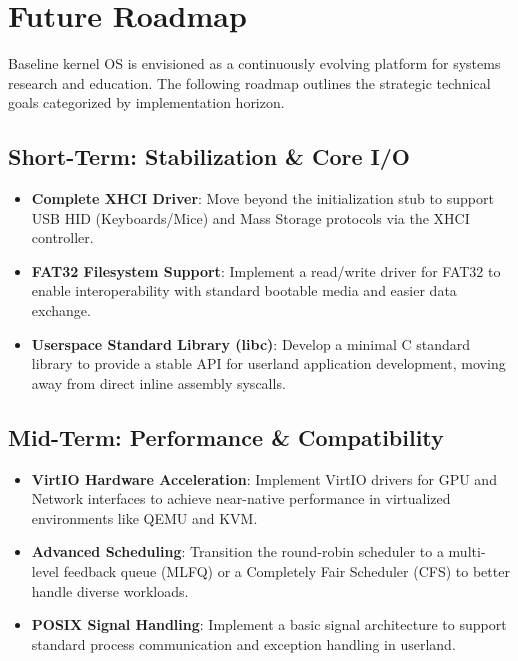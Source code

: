 \documentclass[12pt,a4paper]{report}
\begin{document}
\newpage

\chapter{Future Roadmap}
Baseline kernel OS is envisioned as a continuously evolving platform for systems research and education. The following roadmap outlines the strategic technical goals categorized by implementation horizon.

\section{Short-Term: Stabilization \& Core I/O}
\begin{itemize}
    \item \textbf{Complete XHCI Driver}: Move beyond the initialization stub to support USB HID (Keyboards/Mice) and Mass Storage protocols via the XHCI controller.
    \item \textbf{FAT32 Filesystem Support}: Implement a read/write driver for FAT32 to enable interoperability with standard bootable media and easier data exchange.
    \item \textbf{Userspace Standard Library (libc)}: Develop a minimal C standard library to provide a stable API for userland application development, moving away from direct inline assembly syscalls.
\end{itemize}

\section{Mid-Term: Performance \& Compatibility}
\begin{itemize}
    \item \textbf{VirtIO Hardware Acceleration}: Implement VirtIO drivers for GPU and Network interfaces to achieve near-native performance in virtualized environments like QEMU and KVM.
    \item \textbf{Advanced Scheduling}: Transition the round-robin scheduler to a multi-level feedback queue (MLFQ) or a Completely Fair Scheduler (CFS) to better handle diverse workloads.
    \item \textbf{POSIX Signal Handling}: Implement a basic signal architecture to support standard process communication and exception handling in userland.
\end{itemize}
\end{document}

